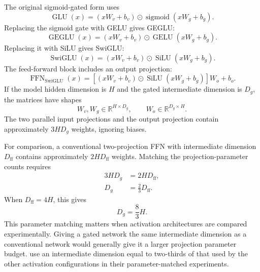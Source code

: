The original sigmoid-gated form uses
\begin{equation}
    \operatorname{GLU}(x)
    =
    (xW_v+b_v)
    \odot
    \operatorname{sigmoid}(xW_g+b_g).
    \label{eq:act-glu-sigmoid}
\end{equation}
Replacing the sigmoid gate with GELU gives GEGLU:
\begin{equation}
    \operatorname{GEGLU}(x)
    =
    (xW_v+b_v)
    \odot
    \operatorname{GELU}(xW_g+b_g).
    \label{eq:act-geglu}
\end{equation}
Replacing it with SiLU gives SwiGLU:
\begin{equation}
    \operatorname{SwiGLU}(x)
    =
    (xW_v+b_v)
    \odot
    \operatorname{SiLU}(xW_g+b_g).
    \label{eq:act-swiglu-gate}
\end{equation}
The feed-forward block includes an output projection:
\begin{equation}
    \operatorname{FFN}_{\mathrm{SwiGLU}}(x)
    =
    \left[
        (xW_v+b_v)
        \odot
        \operatorname{SiLU}(xW_g+b_g)
    \right]W_o+b_o.
    \label{eq:act-swiglu-ffn}
\end{equation}
If the model hidden dimension is \(H\) and the gated intermediate
dimension is \(D_g\), the matrices have shapes
\begin{equation}
    W_v,W_g\in\mathbb{R}^{H\times D_g},
    \qquad
    W_o\in\mathbb{R}^{D_g\times H}.
    \label{eq:act-swiglu-shapes}
\end{equation}
The two parallel input projections and the output projection contain
approximately \(3HD_g\) weights, ignoring biases.

For comparison, a conventional two-projection FFN with intermediate
dimension \(D_{\mathrm{ff}}\) contains approximately
\(2HD_{\mathrm{ff}}\) weights. Matching the projection-parameter counts
requires
\begin{align}
    3HD_g&=2HD_{\mathrm{ff}},
    \label{eq:act-swiglu-match}\\
    D_g&=\frac{2}{3}D_{\mathrm{ff}}.
    \label{eq:act-swiglu-dimension}
\end{align}
When \(D_{\mathrm{ff}}=4H\), this gives
\begin{equation}
    D_g=\frac{8}{3}H.
    \label{eq:act-swiglu-four-h}
\end{equation}
This parameter matching matters when activation architectures are compared
experimentally. Giving a gated network the same intermediate dimension
as a conventional network would generally give it a larger projection
parameter budget. \textcite{zhuo2025polycom} use an intermediate dimension
equal to two-thirds of that used by the other activation configurations
in their parameter-matched experiments.

